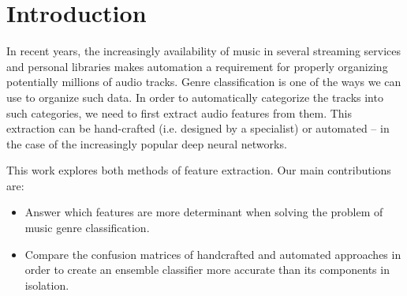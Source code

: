\section{Introduction}

In recent years, the increasingly availability of music in several streaming services and personal libraries makes automation a requirement for properly organizing potentially millions of audio tracks. Genre classification is one of the ways we can use to organize such data. In order to automatically categorize the tracks into such categories, we need to first extract audio features from them. This extraction can be hand-crafted (i.e. designed by a specialist) or automated -- in the case of the increasingly popular deep neural networks.



This work explores both methods of feature extraction. Our main contributions are:

\begin{itemize}
    \item Answer which features are more determinant when solving the problem of music genre classification.
    \item Compare the confusion matrices of handcrafted and automated approaches in order to create an ensemble classifier more accurate than its components in isolation.
\end{itemize}

